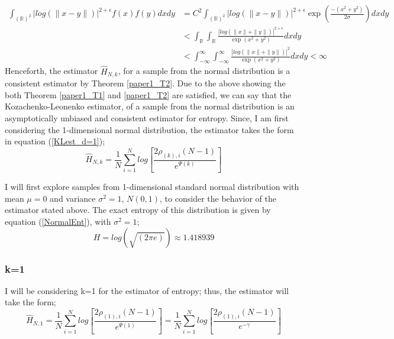\documentclass{article}
\begin{document}
\begin{align} \nonumber
\int_{(\mathbb{R})^2} | log(\|x-y\|)|^{2+ \epsilon} f(x) f(y) dx dy  &= C^2 \int_{(\mathbb{R})^2} | log(\|x-y\|)|^{2+ \epsilon} \exp{\left(\frac{-(x^2 + y^2)}{2 \sigma}\right)} dx dy \\ \nonumber
&< \int_{\mathbb{R}} \int_{\mathbb{R}} \frac{| log(\|x\| + \|y\|)|^{2+ \epsilon}}{\exp{(x^2 + y^2)}} dx dy \\ \nonumber
&< \int_{-\infty}^{\infty} \int_{-\infty}^{\infty} \frac{| log(\|x\| + \|y\|)|^2}{\exp{(x^2 + y^2)}} dx dy < \infty  \nonumber
\end{align}
Henceforth, the estimator $\hat{H}_{N,k}$, for a sample from the normal distribution is a consistent estimator by Theorem \ref{paper1_T2}. Due to the above showing the both Theorem \ref{paper1_T1} and \ref{paper1_T2} are satisfied, we can say that the Kozachenko-Leonenko estimator, of a sample from the normal distribution is an asymptotically unbiased and consistent estimator for entropy. Since, I am first considering the 1-dimensional normal distribution, the estimator takes the form in equation (\ref{KLest_d=1});
\begin{equation}
\hat{H}_{N, k} =  \frac{1}{N} \sum_{i=1}^{N} log \left[ \frac{2\rho_{(k),i}(N-1)}{e^{\Psi(k)}} \right]\nonumber
\end{equation}

I will first explore samples from 1-dimensional standard normal distribution with mean $\mu = 0$ and variance $\sigma^2 = 1$, $N(0, 1)$, to consider the behavior of the estimator stated above. The exact entropy of this distribution is given by equation (\ref{NormalEnt}), with $\sigma^2=1$;
\begin{equation} \label{normal_exact}
H = log(\sqrt{(2\pi e)}) \approx 1.418939
\end{equation}




\subsubsection{k=1} \label{N_k=1}
I will be considering k=1 for the estimator of entropy; thus, the estimator will take the form;
\begin{equation} 
\hat{H}_{N, 1} = \frac{1}{N} \sum_{i=1}^{N} log \left[ \frac{2\rho_{(1),i} (N-1)}{e^{\Psi(1)}} \right] = \frac{1}{N} \sum_{i=1}^{N} log \left[ \frac{2\rho_{(1),i} (N-1)}{e^{-\gamma}} \right] \nonumber
\end{equation}
\end{document}
